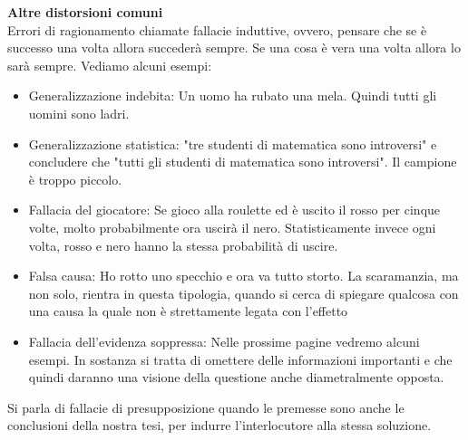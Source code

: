 \documentclass[12pt]{book} %
\begin{document}
\noindent \textbf{\large Altre distorsioni comuni} \\
Errori di ragionamento chiamate fallacie induttive, ovvero, pensare che se è successo una volta allora succederà sempre.
Se una cosa è vera una volta allora lo sarà sempre. Vediamo alcuni esempi:

\begin{itemize}
\item Generalizzazione indebita: Un uomo ha rubato una mela. Quindi tutti gli uomini sono ladri.
\item Generalizzazione statistica: "tre studenti di matematica sono introversi" e concludere che "tutti gli studenti di matematica sono introversi". Il campione è troppo piccolo.
\item Fallacia del giocatore: Se gioco alla roulette ed è uscito il rosso per cinque volte, molto probabilmente ora
uscirà il nero. Statisticamente invece ogni volta, rosso e nero hanno la stessa probabilità di uscire.
\item Falsa causa: Ho rotto uno specchio e ora va tutto storto. La scaramanzia, ma non solo, rientra in questa
tipologia, quando si cerca di spiegare qualcosa con una causa la quale non è strettamente legata con
l'effetto
\item Fallacia dell'evidenza soppressa: Nelle prossime pagine vedremo alcuni esempi. In sostanza si tratta di omettere
delle informazioni importanti e che quindi daranno una visione della questione anche diametralmente opposta.
\end{itemize}

\bigskip

Si parla di fallacie di presupposizione quando le premesse sono anche le conclusioni della nostra tesi, per indurre
l'interlocutore alla stessa soluzione.
\end{document}
